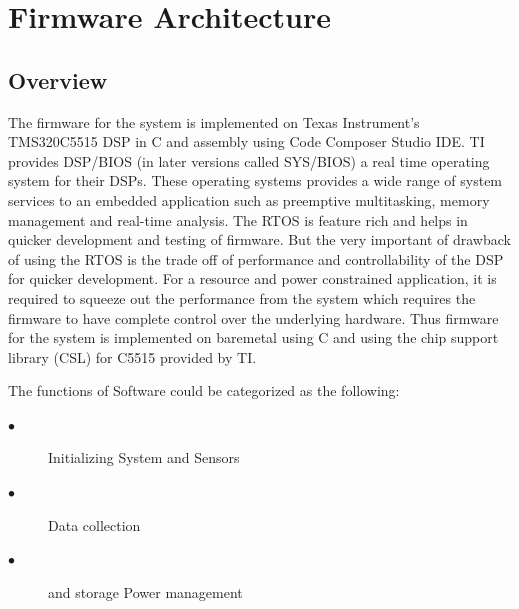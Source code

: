 \chapter{Firmware Architecture}

\section{Overview}
The firmware for the system is implemented on Texas Instrument's TMS320C5515 DSP in C and assembly using Code Composer Studio IDE. TI provides DSP/BIOS (in later versions called SYS/BIOS)  a real time operating system for their DSPs. These operating systems provides a wide range of system services to an embedded application such as preemptive multitasking, memory management and real-time analysis. The RTOS is feature rich and helps in quicker development and testing of firmware. But the very important of drawback of using the RTOS is the trade off of performance and controllability of the DSP for quicker development. For a resource and power constrained application, it is required to squeeze out the performance from the system which requires the firmware to have complete control over the underlying hardware. Thus firmware for the system is implemented on baremetal using  C and using the chip support library (CSL) for C5515 provided by TI. 


\vfill

The functions of Software could be categorized as the following:
 \begin{description}
 	\item[$\bullet$]
Initializing System and Sensors 
 	\item[$\bullet$]
Data collection
 	\item[$\bullet$] and storage 
Power management 
 \end{description}

